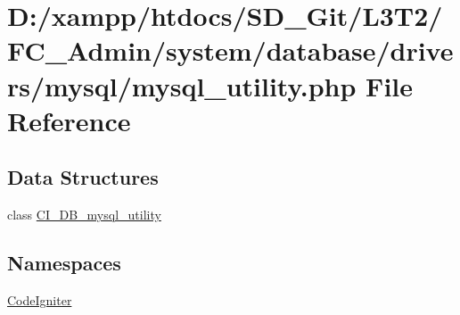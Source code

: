 \hypertarget{_admin_2system_2database_2drivers_2mysql_2mysql__utility_8php}{}\section{D\+:/xampp/htdocs/\+S\+D\+\_\+\+Git/\+L3\+T2/\+F\+C\+\_\+\+Admin/system/database/drivers/mysql/mysql\+\_\+utility.php File Reference}
\label{_admin_2system_2database_2drivers_2mysql_2mysql__utility_8php}
\subsection*{Data Structures}
\begin{DoxyCompactItemize}
\item 
class \hyperlink{class_c_i___d_b__mysql__utility}{C\+I\+\_\+\+D\+B\+\_\+mysql\+\_\+utility}
\end{DoxyCompactItemize}
\subsection*{Namespaces}
\begin{DoxyCompactItemize}
\item 
 \hyperlink{namespace_code_igniter}{Code\+Igniter}
\end{DoxyCompactItemize}
